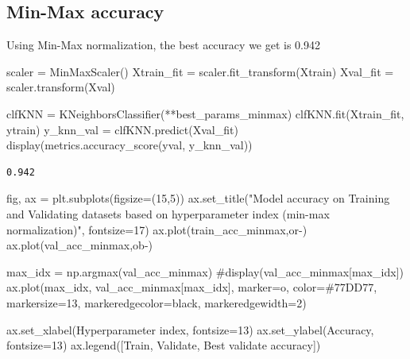 \documentclass[
  letterpaper,
  DIV=11,
  numbers=noendperiod]{scrartcl}
\newenvironment{Shaded}{\begin{snugshade}}{\end{snugshade}}
\newcommand{\CommentTok}[1]{\textcolor[rgb]{0.37,0.37,0.37}{#1}}
\newcommand{\DecValTok}[1]{\textcolor[rgb]{0.68,0.00,0.00}{#1}}
\newcommand{\NormalTok}[1]{\textcolor[rgb]{0.00,0.23,0.31}{#1}}
\newcommand{\OperatorTok}[1]{\textcolor[rgb]{0.37,0.37,0.37}{#1}}
\newcommand{\StringTok}[1]{\textcolor[rgb]{0.13,0.47,0.30}{#1}}
\begin{document}
\subsection{Min-Max accuracy}\label{min-max-accuracy}

Using Min-Max normalization, the best accuracy we get is 0.942

\begin{Shaded}
\begin{Highlighting}[]
\NormalTok{scaler }\OperatorTok{=}\NormalTok{ MinMaxScaler()}
\NormalTok{Xtrain\_fit }\OperatorTok{=}\NormalTok{ scaler.fit\_transform(Xtrain)}
\NormalTok{Xval\_fit }\OperatorTok{=}\NormalTok{ scaler.transform(Xval)}

\NormalTok{clfKNN }\OperatorTok{=}\NormalTok{ KNeighborsClassifier(}\OperatorTok{**}\NormalTok{best\_params\_minmax)}
\NormalTok{clfKNN.fit(Xtrain\_fit, ytrain)}
\NormalTok{y\_knn\_val }\OperatorTok{=}\NormalTok{ clfKNN.predict(Xval\_fit)}
\NormalTok{display(metrics.accuracy\_score(yval, y\_knn\_val))}
\end{Highlighting}
\end{Shaded}

\begin{verbatim}
0.942
\end{verbatim}

\begin{Shaded}
\begin{Highlighting}[]
\NormalTok{fig, ax }\OperatorTok{=}\NormalTok{ plt.subplots(figsize}\OperatorTok{=}\NormalTok{(}\DecValTok{15}\NormalTok{,}\DecValTok{5}\NormalTok{))}
\NormalTok{ax.set\_title(}\StringTok{"Model accuracy on Training and Validating datasets based on hyperparameter index (min{-}max normalization)"}\NormalTok{, fontsize}\OperatorTok{=}\DecValTok{17}\NormalTok{)}
\NormalTok{ax.plot(train\_acc\_minmax,}\StringTok{\textquotesingle{}or{-}\textquotesingle{}}\NormalTok{)}
\NormalTok{ax.plot(val\_acc\_minmax,}\StringTok{\textquotesingle{}ob{-}\textquotesingle{}}\NormalTok{)}


\NormalTok{max\_idx }\OperatorTok{=}\NormalTok{ np.argmax(val\_acc\_minmax)}
\CommentTok{\#display(val\_acc\_minmax[max\_idx])}
\NormalTok{ax.plot(max\_idx, val\_acc\_minmax[max\_idx], marker}\OperatorTok{=}\StringTok{\textquotesingle{}o\textquotesingle{}}\NormalTok{, color}\OperatorTok{=}\StringTok{\textquotesingle{}\#77DD77\textquotesingle{}}\NormalTok{, markersize}\OperatorTok{=}\DecValTok{13}\NormalTok{, markeredgecolor}\OperatorTok{=}\StringTok{\textquotesingle{}black\textquotesingle{}}\NormalTok{, markeredgewidth}\OperatorTok{=}\DecValTok{2}\NormalTok{)}

\NormalTok{ax.set\_xlabel(}\StringTok{\textquotesingle{}Hyperparameter index\textquotesingle{}}\NormalTok{, fontsize}\OperatorTok{=}\DecValTok{13}\NormalTok{)}
\NormalTok{ax.set\_ylabel(}\StringTok{\textquotesingle{}Accuracy\textquotesingle{}}\NormalTok{, fontsize}\OperatorTok{=}\DecValTok{13}\NormalTok{)}
\NormalTok{ax.legend([}\StringTok{\textquotesingle{}Train\textquotesingle{}}\NormalTok{, }\StringTok{\textquotesingle{}Validate\textquotesingle{}}\NormalTok{, }\StringTok{\textquotesingle{}Best validate accuracy\textquotesingle{}}\NormalTok{])}
\end{Highlighting}
\end{Shaded}
\end{document}
